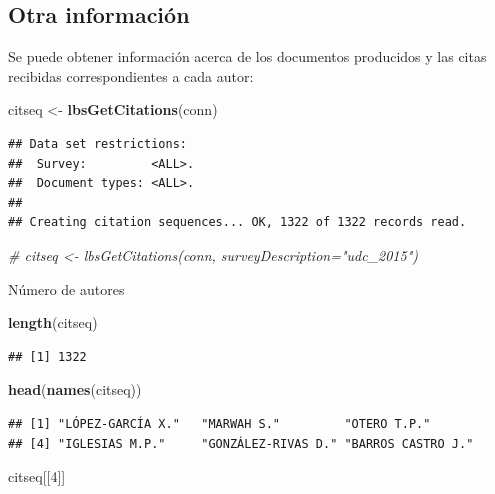 \documentclass[]{book}
\newenvironment{Shaded}{\begin{snugshade}}{\end{snugshade}}
\newcommand{\KeywordTok}[1]{\textcolor[rgb]{0.13,0.29,0.53}{\textbf{#1}}}
\newcommand{\DecValTok}[1]{\textcolor[rgb]{0.00,0.00,0.81}{#1}}
\newcommand{\StringTok}[1]{\textcolor[rgb]{0.31,0.60,0.02}{#1}}
\newcommand{\CommentTok}[1]{\textcolor[rgb]{0.56,0.35,0.01}{\textit{#1}}}
\newcommand{\NormalTok}[1]{#1}
\begin{document}
\subsection{Otra información}\label{otra-informacion}

Se puede obtener información acerca de los documentos producidos y las
citas recibidas correspondientes a cada autor:

\begin{Shaded}
\begin{Highlighting}[]
\NormalTok{citseq <-}\StringTok{ }\KeywordTok{lbsGetCitations}\NormalTok{(conn)}
\end{Highlighting}
\end{Shaded}

\begin{verbatim}
## Data set restrictions:
##  Survey:         <ALL>.
##  Document types: <ALL>.
## 
## Creating citation sequences... OK, 1322 of 1322 records read.
\end{verbatim}

\begin{Shaded}
\begin{Highlighting}[]
\CommentTok{# citseq <- lbsGetCitations(conn, surveyDescription="udc_2015")}
\end{Highlighting}
\end{Shaded}

Número de autores

\begin{Shaded}
\begin{Highlighting}[]
\KeywordTok{length}\NormalTok{(citseq) }
\end{Highlighting}
\end{Shaded}

\begin{verbatim}
## [1] 1322
\end{verbatim}

\begin{Shaded}
\begin{Highlighting}[]
\KeywordTok{head}\NormalTok{(}\KeywordTok{names}\NormalTok{(citseq))}
\end{Highlighting}
\end{Shaded}

\begin{verbatim}
## [1] "LÓPEZ-GARCÍA X."   "MARWAH S."         "OTERO T.P."       
## [4] "IGLESIAS M.P."     "GONZÁLEZ-RIVAS D." "BARROS CASTRO J."
\end{verbatim}

\begin{Shaded}
\begin{Highlighting}[]
\NormalTok{citseq[[}\DecValTok{4}\NormalTok{]]}
\end{Highlighting}
\end{Shaded}
\end{document}
